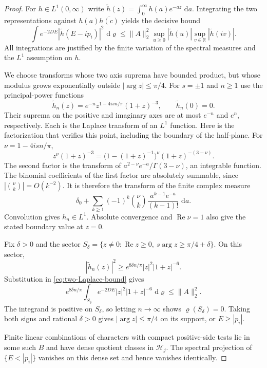 \documentclass[11pt,letterpaper,reqno]{amsart}
\newcommand{\R}{\mathbb R}
\newcommand{\dd}{\,\mathrm d}
\begin{document}
\begin{proof}
For $h\in L^1(0,\infty)$ write
$\widetilde h(z)=\int_0^\infty h(a)e^{-az}\,\dd a$.
Integrating the two representations against
$h(a)\overline{h(c)}$ yields the decisive bound
\begin{equation}\label{eq:two-Laplace-bound}
 \int e^{-2DE}|\widetilde h(E-ip_i)|^2\,\dd\varrho
 \le\|A\|_2^2
 \sup_{u\ge0}|\widetilde h(u)|
 \sup_{v\in\R}|\widetilde h(iv)|.
\end{equation}
All integrations are justified by the finite variation of the
spectral measures and the $L^1$ assumption on $h$.

We choose transforms whose two axis suprema have bounded product,
but whose modulus grows exponentially outside $|\arg z|\le\pi/4$.
For $s=\pm1$ and $n\ge1$ use the principal-power functions
\begin{equation}\label{eq:cone-Laplace-tests}
 \widetilde h_n(z)
 =e^{-n}z^{1-4isn/\pi}(1+z)^{-3},\qquad
 \widetilde h_n(0)=0.
\end{equation}
Their suprema on the positive and imaginary axes are at most
$e^{-n}$ and $e^n$, respectively. Each is the Laplace transform of
an $L^1$ function. Here is the factorization that verifies this
point, including the boundary of the half-plane. For
$\nu=1-4isn/\pi$,
\[
 z^\nu(1+z)^{-3}
 =\bigl(1-(1+z)^{-1}\bigr)^\nu(1+z)^{-(3-\nu)}.
\]
The second factor is the transform of
$a^{2-\nu}e^{-a}/\Gamma(3-\nu)$, an integrable function.
The binomial coefficients of the first factor are absolutely
summable, since $|\binom\nu k|=O(k^{-2})$. It is therefore the
transform of the finite complex measure
\[
 \delta_0+
 \sum_{k\ge1}(-1)^k\binom\nu k
 \frac{a^{k-1}e^{-a}}{(k-1)!}\,\dd a.
\]
Convolution gives $h_n\in L^1$. Absolute convergence and
$\operatorname{Re}\nu=1$ also give the stated boundary value at
$z=0$.

Fix $\delta>0$ and the sector
$S_\delta=\{z\ne0:\operatorname{Re}z\ge0,
\ s\arg z\ge\pi/4+\delta\}$. On this sector,
\[
 |\widetilde h_n(z)|^2
 \ge e^{8\delta n/\pi}|z|^2|1+z|^{-6}.
\]
Substitution in \eqref{eq:two-Laplace-bound} gives
\[
 e^{8\delta n/\pi}
 \int_{S_\delta}e^{-2DE}|z|^2|1+z|^{-6}\,\dd\varrho
 \le\|A\|_2^2.
\]
The integrand is positive on $S_\delta$, so letting $n\to\infty$
shows $\varrho(S_\delta)=0$. Taking both signs and rational
$\delta>0$ gives $|\arg z|\le\pi/4$ on its support, or
$E\ge|p_i|$.

Finite linear combinations of characters with compact positive-side
tests lie in some such $B$ and have dense quotient classes in
$\mathcal H_j$. The spectral projection of $\{E<|p_i|\}$
vanishes on this dense set and hence vanishes identically.
\end{proof}
\end{document}
